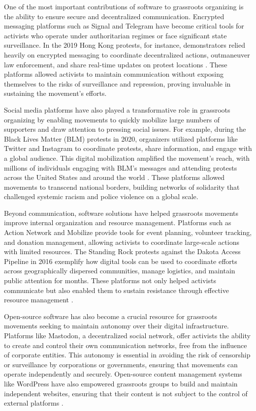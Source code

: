\begin{refsection}
One of the most important contributions of software to grassroots organizing is the ability to ensure secure and decentralized communication. Encrypted messaging platforms such as Signal and Telegram have become critical tools for activists who operate under authoritarian regimes or face significant state surveillance. In the 2019 Hong Kong protests, for instance, demonstrators relied heavily on encrypted messaging to coordinate decentralized actions, outmaneuver law enforcement, and share real-time updates on protest locations \cite[pp.~112-115]{tufekcitwittertear}. These platforms allowed activists to maintain communication without exposing themselves to the risks of surveillance and repression, proving invaluable in sustaining the movement’s efforts.

Social media platforms have also played a transformative role in grassroots organizing by enabling movements to quickly mobilize large numbers of supporters and draw attention to pressing social issues. For example, during the Black Lives Matter (BLM) protests in 2020, organizers utilized platforms like Twitter and Instagram to coordinate protests, share information, and engage with a global audience. This digital mobilization amplified the movement's reach, with millions of individuals engaging with BLM’s messages and attending protests across the United States and around the world \cite[pp.~94-97]{tufekcitwittertear}. These platforms allowed movements to transcend national borders, building networks of solidarity that challenged systemic racism and police violence on a global scale.

Beyond communication, software solutions have helped grassroots movements improve internal organization and resource management. Platforms such as Action Network and Mobilize provide tools for event planning, volunteer tracking, and donation management, allowing activists to coordinate large-scale actions with limited resources. The Standing Rock protests against the Dakota Access Pipeline in 2016 exemplify how digital tools can be used to coordinate efforts across geographically dispersed communities, manage logistics, and maintain public attention for months. These platforms not only helped activists communicate but also enabled them to sustain resistance through effective resource management \cite[pp.~203-206]{estesourhistoryfuture}.

Open-source software has also become a crucial resource for grassroots movements seeking to maintain autonomy over their digital infrastructure. Platforms like Mastodon, a decentralized social network, offer activists the ability to create and control their own communication networks, free from the influence of corporate entities. This autonomy is essential in avoiding the risk of censorship or surveillance by corporations or governments, ensuring that movements can operate independently and securely. Open-source content management systems like WordPress have also empowered grassroots groups to build and maintain independent websites, ensuring that their content is not subject to the control of external platforms \cite[pp.~101-105]{stallmanfreesoftware}.


\end{refsection}
